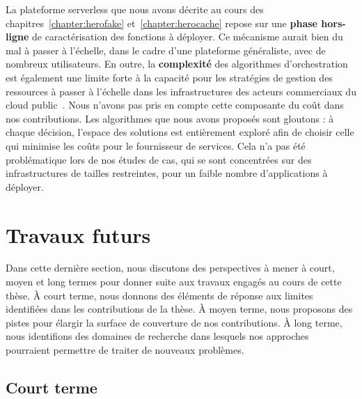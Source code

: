 La plateforme serverless que nous avons décrite au cours des chapitres~\ref{chapter:herofake} et~\ref{chapter:herocache} repose sur une \textbf{phase hors-ligne} de caractérisation des fonctions à déployer. Ce mécanisme aurait bien du mal à passer à l'échelle, dans le cadre d'une plateforme généraliste, avec de nombreux utilisateurs. En outre, la \textbf{complexité} des algorithmes d'orchestration est également une limite forte à la capacité pour les stratégies de gestion des ressources à passer à l'échelle dans les infrastructures des acteurs commerciaux du cloud public~\cite{fuerstIluvatarFastControl2023}. Nous n'avons pas pris en compte cette composante du coût dans nos contributions. Les algorithmes que nous avons proposés sont gloutons : à chaque décision, l'espace des solutions est entièrement exploré afin de choisir celle qui minimise les coûts pour le fournisseur de services. Cela n'a pas été problématique lors de nos études de cas, qui se sont concentrées sur des infrastructures de tailles restreintes, pour un faible nombre d'applications à déployer.

\section{Travaux futurs}
\label{section:conclusion-perspectives}

Dans cette dernière section, nous discutons des perspectives à mener à court, moyen et long termes pour donner suite aux travaux engagés au cours de cette thèse. À court terme, nous donnons des éléments de réponse aux limites identifiées dans les contributions de la thèse. À moyen terme, nous proposons des pistes pour élargir la surface de couverture de nos contributions. À long terme, nous identifions des domaines de recherche dans lesquels nos approches pourraient permettre de traiter de nouveaux problèmes.

\subsection{Court terme}


